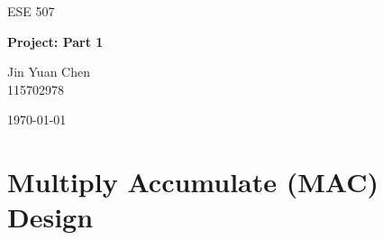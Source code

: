 \documentclass[a4paper,11pt]{article}
\begin{document}

\begin{titlepage}

\centering

\vspace*{1.5in}

{\Large ESE 507\par}

\vspace{0.5in}

{\Huge\bfseries Project: Part 1\par}

\vspace{1in}

{\large
Jin Yuan Chen\\[0.25em]
115702978
\par}

\vfill

{\large \today\par}

\end{titlepage}






\tableofcontents

\newpage

\section{Multiply Accumulate (MAC) Design}
\end{document}
